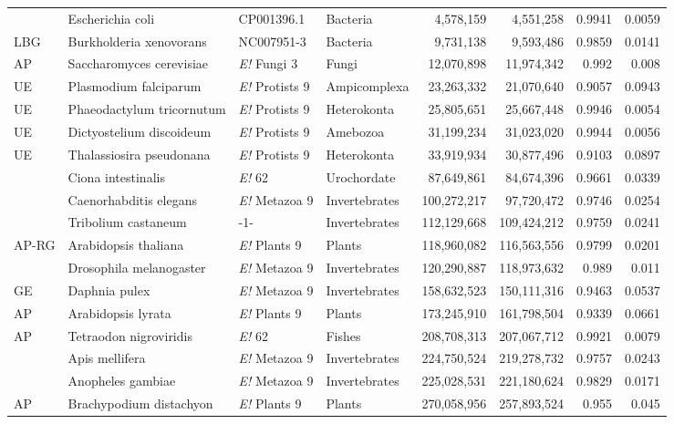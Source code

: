 \begin{table}[htbp]
{\begin{tabular}{ l l p{62pt} l r r r r }
 & Escherichia coli & CP001396.1 & Bacteria & 4,578,159 & 4,551,258 & 0.9941 & 0.0059 \\
LBG & Burkholderia xenovorans & NC007951-3 & Bacteria & 9,731,138 & 9,593,486 & 0.9859 & 0.0141 \\
AP & Saccharomyces cerevisiae & {\it E!} Fungi 3 & Fungi & 12,070,898 & 11,974,342 & 0.992 & 0.008 \\
UE & Plasmodium falciparum & {\it E!} Protists 9 & Ampicomplexa & 23,263,332 & 21,070,640 & 0.9057 & 0.0943 \\
UE & Phaeodactylum tricornutum & {\it E!} Protists 9 & Heterokonta & 25,805,651 & 25,667,448 & 0.9946 & 0.0054 \\
UE & Dictyostelium discoideum & {\it E!} Protists 9 & Amebozoa & 31,199,234 & 31,023,020 & 0.9944 & 0.0056 \\
UE & Thalassiosira pseudonana & {\it E!} Protists 9 & Heterokonta & 33,919,934 & 30,877,496 & 0.9103 & 0.0897 \\
 & Ciona intestinalis & {\it E!} 62 & Urochordate & 87,649,861 & 84,674,396 & 0.9661 & 0.0339 \\
 & Caenorhabditis elegans & {\it E!} Metazoa 9 & Invertebrates & 100,272,217 & 97,720,472 & 0.9746 & 0.0254 \\
 & Tribolium castaneum & -1- & Invertebrates & 112,129,668 & 109,424,212 & 0.9759 & 0.0241 \\
AP-RG & Arabidopsis thaliana & {\it E!} Plants 9 & Plants & 118,960,082 & 116,563,556 & 0.9799 & 0.0201 \\
 & Drosophila melanogaster & {\it E!} Metazoa 9 & Invertebrates & 120,290,887 & 118,973,632 & 0.989 & 0.011 \\
GE & Daphnia pulex & {\it E!} Metazoa 9 & Invertebrates & 158,632,523 & 150,111,316 & 0.9463 & 0.0537 \\
AP & Arabidopsis lyrata & {\it E!} Plants 9 & Plants & 173,245,910 & 161,798,504 & 0.9339 & 0.0661 \\
AP & Tetraodon nigroviridis & {\it E!} 62 & Fishes & 208,708,313 & 207,067,712 & 0.9921 & 0.0079 \\
 & Apis mellifera & {\it E!} Metazoa 9 & Invertebrates & 224,750,524 & 219,278,732 & 0.9757 & 0.0243 \\
 & Anopheles gambiae & {\it E!} Metazoa 9 & Invertebrates & 225,028,531 & 221,180,624 & 0.9829 & 0.0171 \\
AP & Brachypodium distachyon & {\it E!} Plants 9 & Plants & 270,058,956 & 257,893,524 & 0.955 & 0.045 \\

\end{tabular}}
\end{table}
